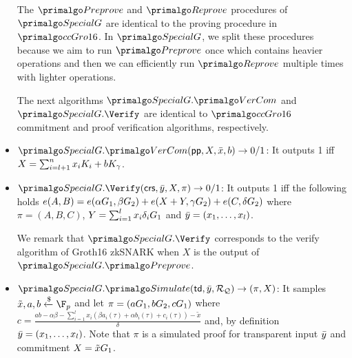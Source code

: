 \begin{itemize}
The $ \Preprove $ and $ \Reprove $ procedures of $ \SpecialG $ are identical to the proving procedure in $ \ccgroth $. In $ \SpecialG $, we split these procedures because we aim to run $ \Preprove $ once which contains heavier operations and then we can efficiently run $ \Reprove $ multiple times  with lighter operations.   


The next algorithms $ \SpecialG.\VerifyCom $ and $ \SpecialG.\Verify $ are identical to $ \ccgroth $ commitment and proof verification algorithms, respectively.
\item $\SpecialG.\VerifyCom(\pp, X, \barx, b) \rightarrow 0/1$: It outputs 1 iff
$X = \sum_{i=l+1}^{n} x_i K_i   + b K_{\gamma}$. 
\item $\SpecialG.\Verify(\crs, \bar{y}, X, \pi) \rightarrow 0/1$: It outputs  1 iff the following holds 
$e(A,B) = e(\alpha{G}_1, \beta{G}_2) + e(X + Y, \gamma {G}_2) + e(C, \delta {G}_2)$
where $\pi = (A, B, C)$, $Y = \sum_{i=1}^{l} x_i \delta_i{G}_1$ 
and $\bar{y} = (x_1, \ldots, x_l)$. 

We remark that $ \SpecialG.\Verify $ corresponds to the verify algorithm of Groth16 zkSNARK when $ X $ is the output of $ \SpecialG.\Preprove$. 

\item$\SpecialG.\Sim(\tw, \bary, \relRQ) \rightarrow (\pi, X)$: It samples $\tilde{x}, a, b \xleftarrow {\$} \F_p$ and let $\pi = (a{G}_1, b {G}_2 , \allowbreak c{G}_1)$ where $c = \frac{ab - \alpha \beta - \sum_{i=1}^{l} x_i (\beta a_i(\tau)+ \alpha b_i(\tau)+ c_i(\tau))- \tilde{x}}{\delta}  $ and, 
by definition $\bar{y} = (x_1, \ldots, x_l)$. Note that $\pi$ is a simulated proof for transparent input $\bar{y}$ 
and commitment $X = \tilde{x} {G}_1$.
\end{itemize} 



